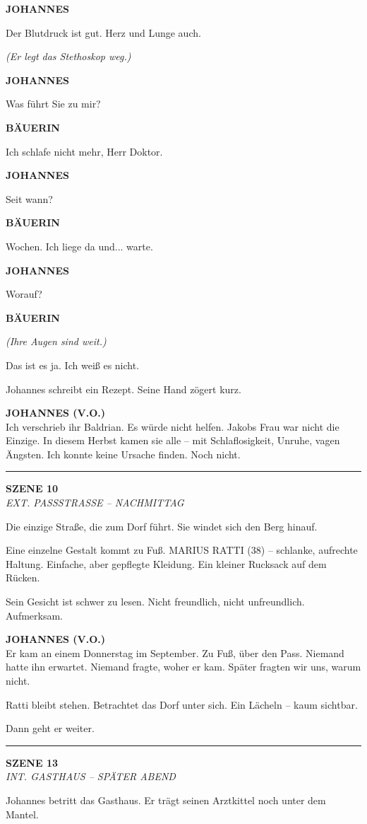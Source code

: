 \documentclass[11pt,a4paper,twoside]{book}
\newcommand{\szene}[2]{%
    \vspace{1em}
    \noindent\textbf{\textsf{#1}}\\
    \textit{#2}
    \vspace{0.5em}
}
\newcommand{\figur}[1]{%
    \vspace{0.5em}
    \noindent\hspace{3cm}\textbf{\MakeUppercase{#1}}\\
    \hspace{3cm}
}
\newcommand{\regieanweisung}[1]{%
    \textit{(#1)}
}
\newcommand{\voiceover}[1]{%
    \begin{voiceoverbox}
    \textbf{JOHANNES (V.O.)}\\
    #1
    \end{voiceoverbox}
}
\begin{document}
\begin{dialogbox}
\figur{Johannes}
Der Blutdruck ist gut. Herz und Lunge auch.

\regieanweisung{Er legt das Stethoskop weg.}

\figur{Johannes}
Was führt Sie zu mir?

\figur{Bäuerin}
Ich schlafe nicht mehr, Herr Doktor.

\figur{Johannes}
Seit wann?

\figur{Bäuerin}
Wochen. Ich liege da und... warte.

\figur{Johannes}
Worauf?

\figur{Bäuerin}
\regieanweisung{Ihre Augen sind weit.}
Das ist es ja. Ich weiß es nicht.
\end{dialogbox}

Johannes schreibt ein Rezept. Seine Hand zögert kurz.

\voiceover{Ich verschrieb ihr Baldrian. Es würde nicht helfen. Jakobs Frau war nicht die Einzige. In diesem Herbst kamen sie alle -- mit Schlaflosigkeit, Unruhe, vagen Ängsten. Ich konnte keine Ursache finden. Noch nicht.}

\vspace{1em}
\hrule
\vspace{1em}

\szene{SZENE 10}{EXT. PASSSTRASSE -- NACHMITTAG}

Die einzige Straße, die zum Dorf führt. Sie windet sich den Berg hinauf.

Eine einzelne Gestalt kommt zu Fuß. MARIUS RATTI (38) -- schlanke, aufrechte Haltung. Einfache, aber gepflegte Kleidung. Ein kleiner Rucksack auf dem Rücken.

Sein Gesicht ist schwer zu lesen. Nicht freundlich, nicht unfreundlich. Aufmerksam.

\voiceover{Er kam an einem Donnerstag im September. Zu Fuß, über den Pass. Niemand hatte ihn erwartet. Niemand fragte, woher er kam. Später fragten wir uns, warum nicht.}

Ratti bleibt stehen. Betrachtet das Dorf unter sich. Ein Lächeln -- kaum sichtbar.

Dann geht er weiter.

\vspace{1em}
\hrule
\vspace{1em}

\szene{SZENE 13}{INT. GASTHAUS -- SPÄTER ABEND}

Johannes betritt das Gasthaus. Er trägt seinen Arztkittel noch unter dem Mantel.
\end{document}
